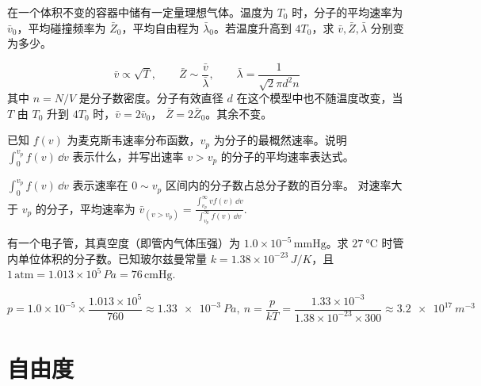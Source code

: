 \documentclass[lang=cn,11pt]{elegantbook}
\begin{document}
\begin{exercise}
在一个体积不变的容器中储有一定量理想气体。温度为 \(T_0\) 时，分子的平均速率为 \(\bar v_0\)，平均碰撞频率为 \(\bar Z_0\)，平均自由程为 \(\bar\lambda_0\)。若温度升高到 \(4T_0\)，求 \(\bar v,\bar Z,\bar\lambda\) 分别变为多少。
\end{exercise}

\begin{solution}
 \[\bar v\propto\sqrt{T},\qquad \bar Z\sim \frac{\bar v}{\bar\lambda},\qquad \bar\lambda=\frac{1}{\sqrt2\pi d^2 n}\] 
其中 \(n=N/V\) 是分子数密度。分子有效直径 \(d\) 在这个模型中也不随温度改变，当 \(T\) 由 \(T_0\) 升到 \(4T_0\) 时，\(\bar v=2\bar v_0\)， \(\bar Z=2\bar Z_0\)。其余不变。
\end{solution}



\begin{exercise}[用麦克斯韦分布函数表示速率区间和条件平均速率]
已知 \(f(v)\) 为麦克斯韦速率分布函数，\(v_p\) 为分子的最概然速率。说明
 \(\int_0^{v_p}f(v)\,\dd v\) 表示什么，并写出速率 \(v>v_p\) 的分子的平均速率表达式。
\end{exercise}

\begin{solution}
 \(\int_0^{v_p}f(v)\,\dd v\) 表示速率在 \(0\sim v_p\) 区间内的分子数占总分子数的百分率。
对速率大于 \(v_p\) 的分子，平均速率为 \(\displaystyle\bar v_{(v>v_p)} =\frac{\int_{v_p}^{\infty}v f(v)\,\dd v} {\int_{v_p}^{\infty}f(v)\,\dd v}.\) 
\end{solution}

\begin{exercise}
有一个电子管，其真空度（即管内气体压强）为 \(1.0\times10^{-5}\,\mathrm{mmHg}\)。求 \(\SI{27}{\celsius}\) 时管内单位体积的分子数。已知玻尔兹曼常量 \(k=1.38\times10^{-23}\,\si{J/K}\)，且
 \(1\,\mathrm{atm}=1.013\times10^5\,\si{Pa}=76\,\mathrm{cmHg}.\) 
\end{exercise}

\begin{solution}
\[
p=1.0\times10^{-5}\times \frac{1.013\times10^5}{760}
\approx \SI{1.33e-3}{Pa},~n=\frac{p}{kT}=\frac{1.33\times10^{-3}}{1.38\times10^{-23}\times300} \approx \SI{3.2e17}{m^{-3}}
\]
\end{solution}

\section{自由度}
\end{document}

